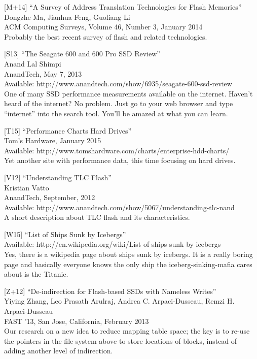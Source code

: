 {[}M+14{]} ``A Survey of Address Translation Technologies for Flash
Memories''\\
Dongzhe Ma, Jianhua Feng, Guoliang Li\\
ACM Computing Surveys, Volume 46, Number 3, January 2014\\
Probably the best recent survey of flash and related technologies.

{[}S13{]} ``The Seagate 600 and 600 Pro SSD Review''\\
Anand Lal Shimpi\\
AnandTech, May 7, 2013\\
Available: http://www.anandtech.com/show/6935/seagate-600-ssd-review\\
One of many SSD performance measurements available on the internet.
Haven't heard of the internet? No problem. Just go to your web browser
and type ``internet'' into the search tool. You'll be amazed at what you
can learn.

{[}T15{]} ``Performance Charts Hard Drives''\\
Tom's Hardware, January 2015\\
Available: http://www.tomshardware.com/charts/enterprise-hdd-charts/\\
Yet another site with performance data, this time focusing on hard
drives.

{[}V12{]} ``Understanding TLC Flash''\\
Kristian Vatto\\
AnandTech, September, 2012\\
Available: http://www.anandtech.com/show/5067/understanding-tlc-nand\\
A short description about TLC flash and its characteristics.

{[}W15{]} ``List of Ships Sunk by Icebergs''\\
Available: http://en.wikipedia.org/wiki/List of ships sunk by icebergs\\
Yes, there is a wikipedia page about ships sunk by icebergs. It is a
really boring page and basically everyone knows the only ship the
iceberg-sinking-mafia cares about is the Titanic.

{[}Z+12{]} ``De-indirection for Flash-based SSDs with Nameless
Writes''\\
Yiying Zhang, Leo Prasath Arulraj, Andrea C. Arpaci-Dusseau, Remzi H.
Arpaci-Dusseau\\
FAST '13, San Jose, California, February 2013\\
Our research on a new idea to reduce mapping table space; the key is to
re-use the pointers in the file system above to store locations of
blocks, instead of adding another level of indirection.

